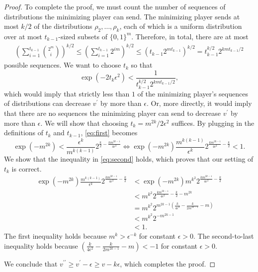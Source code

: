 \documentclass[10pt,a4paper]{article}
\newcommand{\eps}{\epsilon}
\theoremstyle{definition}
\begin{document}
\begin{proof}
    To complete the proof, we must count the number of sequences of distributions the minimizing player can send. 
    The minimizing player sends at most $k/2$ of the distributions $\rho_2, \ldots, \rho_k$, each of which is a uniform distribution over at most $t_{k-1}$-sized subsets of $\{0,1\}^m$. 
    Therefore, in total, there are at most
    \begin{gather*}
        \left(\sum_{i=1}^{t_{k-1}} \binom{2^m}{i} \right)^{k/2} \leq \left(\sum_{i=1}^{t_{k-1}} 2^{im} \right)^{k/2} \leq \left(t_{k-1} 2^{mt_{k-1}}\right)^{k/2} = t^{k/2}_{k-1} 2^{kmt_{k-1}/2}
    \end{gather*}
    possible sequences.
    We want to choose $t_k$ so that 
    \begin{equation}\label{eq:first}
    \exp\left(-2 t_k \eps^2\right) < \frac{1}{t^{k/2}_{k-1} 2^{kmt_{k-1}/2}},
    \end{equation}
    which would imply that strictly less than $1$ of the minimizing player's sequences of distributions can decrease $v^\prime$ by more than $\eps$. 
    Or, more directly, it would imply that there are no sequences the minimizing player can send to decrease $v^\prime$ by more than $\eps$. 
    We will show that choosing $t_k = m^{2k}/2\eps^2$ suffices. 
    By plugging in the definitions of $t_k$ and $t_{k-1}$, \cref{eq:first} becomes 
    \begin{equation}\label{eq:second}
    \exp\left(-m^{2k}\right) < \frac{\eps^k}{ m^{k(k-1)}} 2^{\frac{k}{2}-\frac{km^{2k -1}}{4 \eps^2}} \iff 
    \exp\left(-m^{2k}\right)  \frac{ m^{k(k-1)}}{\eps^k} 2^{\frac{km^{2k -1}}{4 \eps^2}-\frac{k}{2}} < 1. 
    \end{equation}
    We show that the inequality in \cref{eq:second} holds, which proves that our setting of $t_k$ is correct. 
    \begin{align*}
    \exp\left(-m^{2k}\right)  \frac{ m^{k(k-1)}}{\eps^k} 2^{\frac{km^{2k -1}}{4 \eps^2}-\frac{k}{2}} 
    &< \exp\left(-m^{2k}\right) m^{k^2} 2^{\frac{km^{2k -1}}{4 \eps^2}-\frac{k}{2}}  \\
    &< m^{k^2} 2^{\frac{km^{2k -1}}{4 \eps^2}-\frac{k}{2} - m^{2k}}  \\
    &= m^{k^2} 2^{m^{2k -1}\left(\frac{k}{4 \eps^2}-\frac{k}{2m^{2k-1}} - m\right)}  \\
    &< m^{k^2} 2^{-m^{2k -1}}  \\
    &< 1. 
    \end{align*}
    The first inequality holds because $m^{k} > \eps^{-k}$ for constant $\eps > 0$. The second-to-last inequality holds because $\left(\frac{k}{4 \eps^2}-\frac{k}{2m^{2k-1}} - m\right) < -1$ for constant $\eps > 0$.

   We conclude that $v^{\prime \prime} \geq v^\prime - \eps \geq v - k\eps$, which completes the proof. 
\end{proof}
\end{document}
